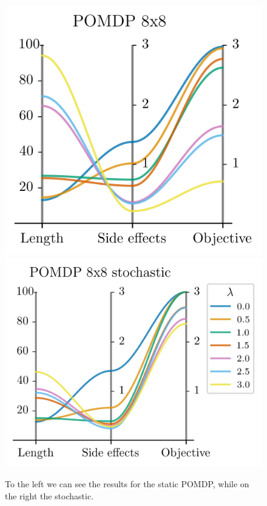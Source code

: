 \documentclass[12pt,A4]{report}
\theoremstyle{definition}
\begin{document}
\begin{figure}[H]
  \centering
  \includegraphics{"./figures/pomdp_8x8_results.png"}
  \includegraphics{"./figures/pomdp_8x8_stochastic_results.png"}
  \caption{To the left we can see the results for the static POMDP, while on the right the stochastic.}
  \label{fig:results_pomdp_8x8}
\end{figure}
\end{document}
